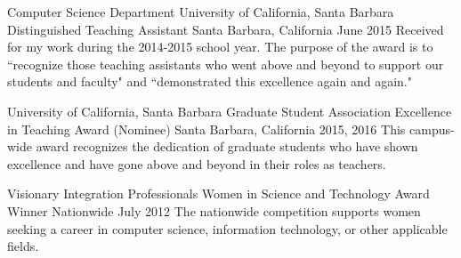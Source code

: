 \begin{cventries}


\cventry
{Computer Science Department \newline University of California, Santa Barbara}
    {Distinguished Teaching Assistant}
    {Santa Barbara, California}
    {June 2015}
    {
      Received for my work during the 2014-2015 school year. The purpose of the award is to ``recognize those teaching assistants who went above and beyond to support our students and faculty"​ and ``demonstrated this excellence again and again."
    }

\cventry
{University of California, Santa Barbara}
    {Graduate Student Association Excellence in Teaching Award (Nominee)}
    {Santa Barbara, California}
    {2015, 2016}
    {
      This campus-wide award recognizes the dedication of graduate students who have shown excellence and have gone above and beyond in their roles as teachers.
    }

\cventry
{Visionary Integration Professionals}
    {Women in Science and Technology Award Winner}
    {Nationwide}
    {July 2012}
    {
      The nationwide competition supports women seeking a career in computer science, information technology, or other applicable fields.
    }%
%

%
%
%


\end{cventries}
